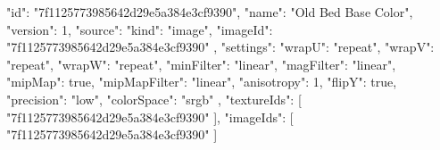 {
  "id": "7f1125773985642d29e5a384e3cf9390",
  "name": "Old Bed Base Color",
  "version": 1,
  "source": {
    "kind": "image",
    "imageId": "7f1125773985642d29e5a384e3cf9390"
  },
  "settings": {
    "wrapU": "repeat",
    "wrapV": "repeat",
    "wrapW": "repeat",
    "minFilter": "linear",
    "magFilter": "linear",
    "mipMap": true,
    "mipMapFilter": "linear",
    "anisotropy": 1,
    "flipY": true,
    "precision": "low",
    "colorSpace": "srgb"
  },
  "textureIds": [
    "7f1125773985642d29e5a384e3cf9390"
  ],
  "imageIds": [
    "7f1125773985642d29e5a384e3cf9390"
  ]
}
